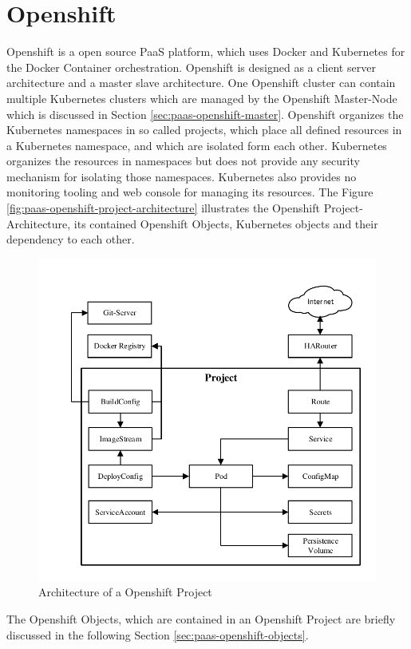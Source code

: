 \section{Openshift}
\label{sec:paas-kubernetes}
Openshift is a open source PaaS platform, which uses Docker and Kubernetes for the Docker Container orchestration. Openshift is designed as a client server architecture and a master slave architecture. One Openshift cluster can contain multiple Kubernetes clusters which are managed by the Openshift Master-Node which is discussed in Section \vref{sec:paas-openshift-master}. Openshift organizes the Kubernetes namespaces in so called projects, which place all defined resources in a Kubernetes namespace, and which are isolated form each other. Kubernetes organizes the resources in namespaces but does not provide any security mechanism for isolating those namespaces. Kubernetes also provides no monitoring tooling and web console for managing its resources. The Figure \vref{fig:paas-openshift-project-architecture} illustrates the Openshift Project-Architecture, its contained Openshift Objects, Kubernetes objects and their dependency to each other.

\begin{figure}[htbp]
	\centering
	\includegraphics[scale=1]{images/openshift-project-architecture.pdf}
	\caption{Architecture of a Openshift Project}
	\label{fig:paas-openshift-project-architecture}
\end{figure} 
The Openshift Objects, which are contained in an Openshift Project are briefly discussed in the following Section \vref{sec:paas-openshift-objects}.


